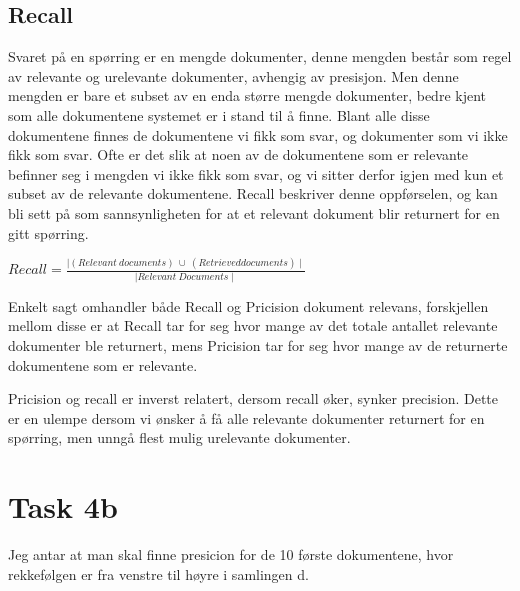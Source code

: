 \vspace{3 mm}

\subsection*{Recall}
Svaret på en spørring er en mengde dokumenter, denne mengden består som regel av relevante og urelevante dokumenter, avhengig av presisjon. Men denne mengden er bare et subset av en enda større mengde dokumenter, bedre kjent som alle dokumentene systemet er i stand til å finne. Blant alle disse dokumentene finnes de dokumentene vi fikk som svar, og dokumenter som vi ikke fikk som svar. Ofte er det slik at noen av de dokumentene som er relevante befinner seg i mengden vi ikke fikk som svar, og vi sitter derfor igjen med kun et subset av de relevante dokumentene. Recall beskriver denne oppførselen, og kan bli sett på som sannsynligheten for at et relevant dokument blir returnert for en gitt spørring.

\vspace{3 mm}

\begin{center}
$Recall = \frac{\mid (Relevant \ documents) \ \cup \ (Retrieved documents) \mid}{\mid Relevant \ Documents \mid}$
\end{center}

\vspace{3 mm}

Enkelt sagt omhandler både Recall og Pricision dokument relevans, forskjellen mellom disse er at Recall tar for seg hvor mange av det totale antallet relevante dokumenter ble returnert, mens Pricision tar for seg hvor mange av de returnerte dokumentene som er relevante.

\vspace{3 mm}

Pricision og recall er inverst relatert, dersom recall øker, synker precision. Dette er en ulempe dersom vi ønsker å få alle relevante dokumenter returnert for en spørring, men unngå flest mulig urelevante dokumenter.

\vspace{6 mm}

\section*{Task 4b}

\vspace{3 mm}

Jeg antar at man skal finne presicion for de 10 første dokumentene, hvor rekkefølgen er fra venstre til høyre i samlingen d.

